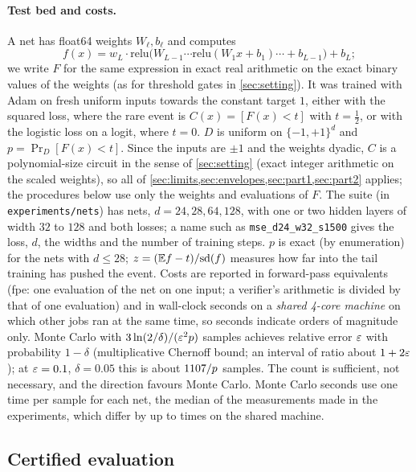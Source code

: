 \paragraph{Test bed and costs.} A net has float64 weights $W_\ell,b_\ell$ and computes
\[
f(x)=w_L\cdot\mathrm{relu}\big(W_{L-1}\cdots\mathrm{relu}(W_1x+b_1)\cdots+b_{L-1}\big)+b_L;
\]
we write $F$ for the same expression in exact real arithmetic on the exact binary values of the
weights (as for threshold gates in \cref{sec:setting}). It was trained with Adam on
fresh uniform inputs towards the constant target $1$, either with the squared loss,
where the rare event is $C(x)=[F(x)<t]$ with $t=\frac12$, or with the logistic loss on
a logit, where $t=0$. $D$ is uniform on $\{-1,+1\}^d$ and
$p=\Pr_D[F(x)<t]$. Since the inputs are $\pm1$ and the weights dyadic, $C$ is a
polynomial-size circuit in the sense of \cref{sec:setting} (exact integer arithmetic
on the scaled weights), so all of \cref{sec:limits,sec:envelopes,sec:part1,sec:part2}
applies; the procedures below use only the weights and evaluations of $F$. The suite
(in \texttt{experiments/nets}) has \nnSuiteNets{} nets, $d=24,28,64,128$, with one or two
hidden layers of width $32$ to $128$ and both losses; a name such as
\texttt{mse\_d24\_w32\_s1500} gives the loss, $d$, the widths and the number of training
steps. $p$ is exact (by enumeration) for the \nnExactNets{} nets with $d\le28$; $z=(\mathbb{E} f-t)/\mathrm{sd}(f)$ measures how far into the
tail training has pushed the event. Costs are reported in forward-pass equivalents
(fpe: one evaluation of the net on one input; a verifier's arithmetic is divided by
that of one evaluation) and in wall-clock seconds on a \emph{shared 4-core machine}
on which other jobs ran at the same time, so seconds indicate orders of magnitude
only. Monte Carlo with $3\ln(2/\delta)/(\varepsilon^2p)$ samples achieves relative error $\varepsilon$
with probability $1-\delta$ (multiplicative Chernoff bound; an interval of ratio about
$1+2\varepsilon$); at $\varepsilon=0.1$, $\delta=0.05$ this is about $1107/p$ samples. The count
is sufficient, not necessary, and the direction favours Monte Carlo. Monte Carlo
seconds use one time per sample for each net, the median of the measurements made in
the experiments, which differ by up to \nnMcTimeSpread{} times on the shared machine.

\subsection{Certified evaluation}\label{sec:nets-eval}

